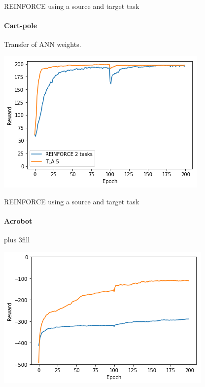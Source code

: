 \begin{frame}[fragile]{REINFORCE using a source and target task}
\framesubtitle{Cart-pole}
Transfer of ANN weights.
\begin{center}
    \includegraphics[width=.8\linewidth]{results/CartPole/reinforce_2tasks.png}
\end{center}
\end{frame}

\begin{frame}[fragile]{REINFORCE using a source and target task}
\framesubtitle{Acrobot}
\vskip0pt plus 3fill
\begin{center}
    \includegraphics[width=.8\linewidth]{results/Acrobot/reinforce_2tasks.png}
\end{center}
\end{frame}

